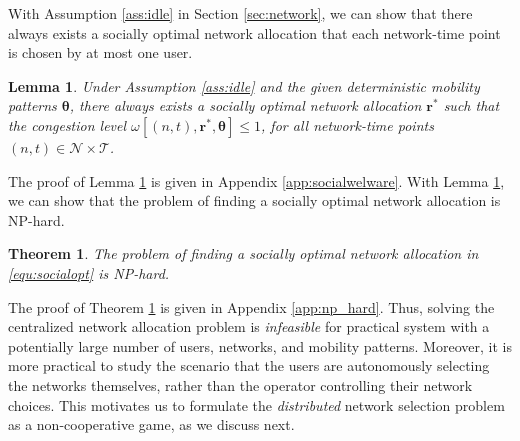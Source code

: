 \documentclass[journal]{IEEEtran}
\newcommand{\mc}[1]{\mathcal{#1}}
\newtheorem{theorem}{Theorem}
\newtheorem{lemma}{Lemma}
\begin{document}
  With Assumption \ref{ass:idle} in Section \ref{sec:network}, we can show that there always exists a socially optimal network allocation that each network-time point is chosen by at most one user.

\begin{lemma} \label{lem:socialwelware}
  Under Assumption \ref{ass:idle} and the given deterministic mobility patterns $\boldsymbol{\theta}$, there always exists a socially optimal network allocation $\boldsymbol{r}^*$ such that the congestion level $\omega[(n, t), \boldsymbol{r}^*, \boldsymbol{\theta}] \leq 1$, for all network-time points $(n,t) \in \mathcal{N} \times \mc{T}$.	
\end{lemma}


	The proof of Lemma \ref{lem:socialwelware} is given in Appendix \ref{app:socialwelware}.
	With Lemma \ref{lem:socialwelware}, we can show that the problem of finding a socially optimal network allocation is NP-hard.


\begin{theorem} \label{thm:np_hard}
  The problem of finding a socially optimal network allocation in \eqref{equ:socialopt} is NP-hard.
\end{theorem}

	The proof of Theorem \ref{thm:np_hard} is given in Appendix \ref{app:np_hard}.
  Thus, solving the centralized network allocation problem is \emph{infeasible} for practical system with a potentially large number of users, networks, and mobility patterns.
	Moreover, it is more practical to study the scenario that the users are autonomously selecting the networks themselves, rather than the operator controlling their network choices.
	This motivates us to formulate the \emph{distributed} network selection problem as a non-cooperative game, as we discuss next. %





\end{document}

